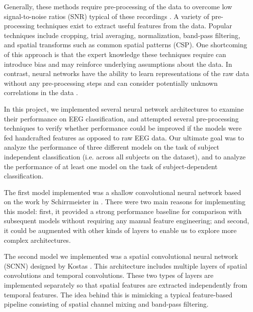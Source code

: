 \documentclass[10pt,twocolumn,letterpaper]{article}
\begin{document}
Generally, these methods require pre-processing of the data to overcome low
signal-to-noise ratios (SNR) typical of these recordings
\cite{kostas2019machine}.
A variety of pre-processing techniques exist to extract useful features from the
data. Popular techniques include cropping, trial averaging, normalization,
band-pass filtering, and spatial transforms such as common spatial patterns
(CSP). One shortcoming of this approach is that the expert knowledge these
techniques require can introduce bias and may reinforce underlying assumptions
about the data.
In contrast, neural networks have the ability to learn representations of the
raw data without any pre-processing steps and can consider potentially unknown
correlations in the data \cite{kostas2019machine}.

In this project, we implemented several neural network architectures to examine
their performance on EEG classification, and attempted several pre-processing
techniques to verify whether performance could be improved if the models were
fed handcrafted features as opposed to raw EEG data.
Our ultimate goal was to analyze the performance of three different models on
the task of subject independent classification (i.e. across all subjects on the
dataset), and to analyze the performance of at least one model on the task of
subject-dependent classification. 

The first model implemented was a shallow convolutional neural network
based on the work by Schirrmeister \etal in \cite{DBLP}. There were two main
reasons for implementing this model: first, it provided a strong performance
baseline for comparison with subsequent models without requiring any manual
feature engineering; and second, it could be augmented with other kinds of
layers to enable us to explore more complex architectures.


The second model we implemented was a spatial convolutional neural network
(SCNN) designed by Kostas \etal \cite{kostas2019machine}. This architecture
includes multiple layers of spatial convolutions and temporal convolutions.
These two types of layers are implemented separately so that spatial features
are extracted independently from temporal features. The idea behind this is
mimicking a typical feature-based pipeline consisting of spatial channel mixing
and band-pass filtering.
\end{document}
